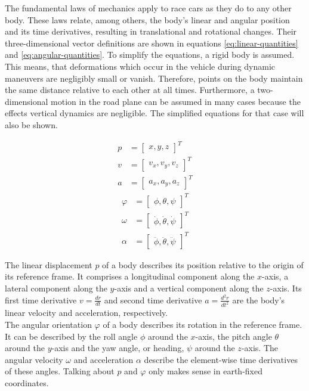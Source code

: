 The fundamental laws of mechanics apply to race cars as they do to any other body. These laws relate, among others, the body's linear and angular position and its time derivatives, resulting in translational and rotational changes. Their three-dimensional vector definitions are shown in equations \ref{eq:linear-quantities} and \ref{eq:angular-quantities}. To simplify the equations, a rigid body is assumed. This means, that deformations which occur in the vehicle during dynamic maneuvers are negligibly small or vanish. Therefore, points on the body maintain the same distance relative to each other at all times. Furthermore, a two-dimensional motion in the road plane can be assumed in many cases because the effects vertical dynamics are negligible. The simplified equations for that case will also be shown.

\begin{subequations}\label{eq:linear-quantities}
\begin{alignat}{2}%
p &= \begin{bmatrix}x, y, z\end{bmatrix}^T \\%
v &= \begin{bmatrix}v_x, v_y, v_z\end{bmatrix}^T \\%
a &= \begin{bmatrix}a_x, a_y, a_z\end{bmatrix}^T%
\end{alignat}
\end{subequations}
\begin{subequations}\label{eq:angular-quantities}
\begin{alignat}{2}%
\varphi &= \begin{bmatrix}\phi, \theta, \psi\end{bmatrix}^T \\%
\omega &= \begin{bmatrix}\dot{\phi}, \dot{\theta}, \dot{\psi}\end{bmatrix}^T \\%
\alpha &= \begin{bmatrix}\ddot{\phi}, \ddot{\theta}, \ddot{\psi}\end{bmatrix}^T%
\end{alignat}
\end{subequations}

The linear displacement $p$ of a body describes its position relative to the origin of its reference frame. It comprises a longitudinal component along the $x$-axis, a lateral component along the $y$-axis and a vertical component along the $z$-axis. Its first time derivative $v = \frac{dr}{dt}$ and second time derivative $a = \frac{d^2r}{dt^2}$ are the body's linear velocity and acceleration, respectively. \\ The angular orientation $\varphi$ of a body describes its rotation in the reference frame. It can be described by the roll angle $\phi$ around the $x$-axis, the pitch angle $\theta$ around the $y$-axis and the yaw angle, or heading, $\psi$ around the $z$-axis. The angular velocity $\omega$ and acceleration $\alpha$ describe the element-wise time derivatives of these angles. Talking about $p$ and $\varphi$ only makes sense in earth-fixed coordinates.


